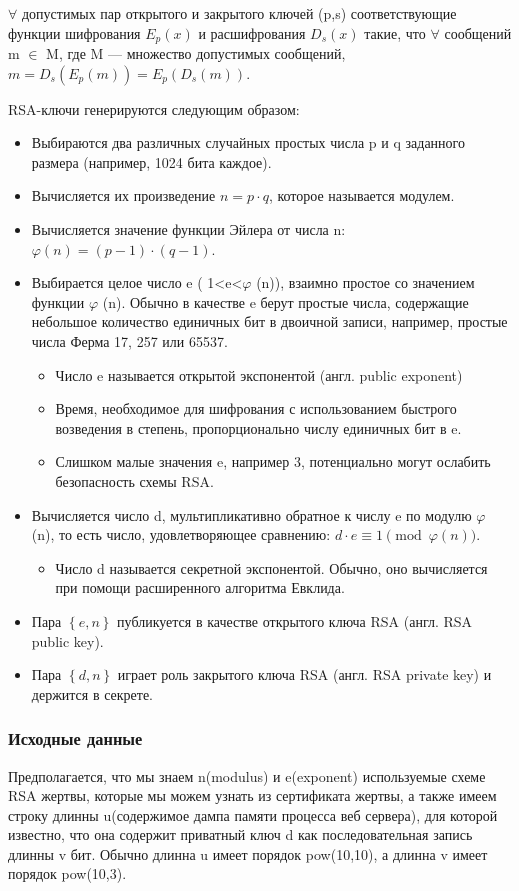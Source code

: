 \documentclass[20pt]{article}
\begin{document}
 $\forall$  допустимых пар открытого и закрытого ключей  (p,s)
  соответствующие функции шифрования $E_{p}(x)$ и расшифрования $D_{s}(x)$ такие, что
 $\forall$  сообщений  m $\in$ M, где  M — множество допустимых сообщений, $m=D_{s}(E_{p}(m))=E_{p}(D_{s}(m))$.


RSA-ключи генерируются следующим образом:
\begin{itemize}
  \item Выбираются два различных случайных простых числа  p и  q заданного размера (например, 1024 бита каждое).
  \item Вычисляется их произведение  $n=p\cdot q$, которое называется модулем.
  \item Вычисляется значение функции Эйлера от числа  n: $\varphi (n)=(p-1)\cdot (q-1)$.
  \item Выбирается целое число  e (  1<e<$\varphi$ (n)), взаимно простое со
  значением функции $\varphi$ (n). Обычно в качестве  e берут простые числа,
  содержащие небольшое количество единичных бит в двоичной записи, например,
  простые числа Ферма 17, 257 или 65537.
  \begin{itemize}
    \item Число e называется открытой экспонентой (англ. public exponent)
    \item Время, необходимое для шифрования с использованием быстрого возведения
    в степень, пропорционально числу единичных бит в e.
    \item Слишком малые значения e, например 3, потенциально могут ослабить
    безопасность схемы RSA.
  \end{itemize}
  \item Вычисляется число  d, мультипликативно обратное к числу  e по модулю
  $\varphi$ (n), то есть число, удовлетворяющее сравнению: $d\cdot e\equiv 1{\pmod {\varphi (n)}}$.
  \begin{itemize}
    \item Число  d называется секретной экспонентой. Обычно, оно вычисляется при помощи расширенного алгоритма Евклида.
  \end{itemize}
  \item Пара $\left\{e,n\right\}$ публикуется в качестве открытого ключа RSA (англ. RSA public key).
  \item Пара $\left\{d,n\right\}$ играет роль закрытого ключа RSA (англ. RSA private key) и держится в секрете.
\end{itemize}


\subsubsection{Исходные данные}
Предполагается, что мы знаем n(modulus) и e(exponent) используемые схеме RSA
жертвы, которые мы можем узнать из сертификата жертвы, а также имеем строку
длинны u(содержимое дампа памяти процесса веб сервера), для которой известно,
что она содержит приватный ключ d как последовательная запись длинны v бит.
Обычно длинна u имеет порядок pow(10,10), а длинна v имеет порядок pow(10,3).
\end{document}
